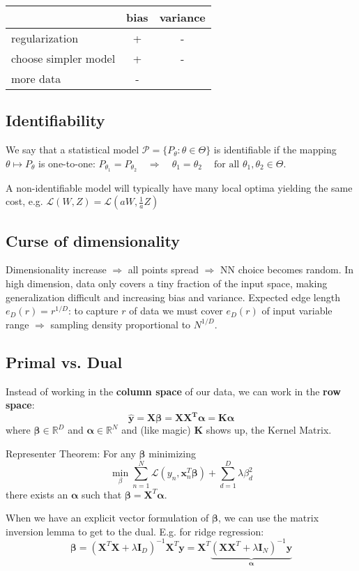 \documentclass[10pt,a4paper,landscape]{article}
\renewcommand{\bf}[1]{\ensuremath{\mathbf{#1}}}
\newcommand{\balpha}{\boldsymbol\alpha}
\newcommand{\bbeta}{\boldsymbol\beta}
\begin{document}
\begin{multicols*}{4}
\begin{tabular}{ l || c | c }
                          & bias & variance \\
  \hline
  regularization          & +    & - \\
  choose simpler model    & +    & - \\
  more data               & -    & \\
  \hline
\end{tabular}

\subsection{Identifiability}
We say that a statistical model $\mathcal{P} = \{P_\theta: \theta \in \Theta\}$ is identifiable if the mapping $\theta \mapsto P_\theta$ is one-to-one:
$P_{\theta_1}=P_{\theta_2} \quad\Rightarrow\quad \theta_1=\theta_2 \quad\ \text{for all } \theta_1,\theta_2\in\Theta.$

A non-identifiable model will typically have many local optima yielding the same cost, e.g. $\mathcal{L}(W, Z) = \mathcal{L}(aW, \frac{1}{a} Z)$

\subsection{Curse of dimensionality}
Dimensionality increase $\Rightarrow$ all points spread $\Rightarrow$ NN choice becomes random. 
In high dimension, data only covers a tiny fraction of the input space, making generalization difficult and increasing bias and variance.
Expected edge length $e_D(r) = r^{1/D}$: to capture $r$ of data we must cover $e_D(r)$ of input variable range $\Rightarrow$ sampling density proportional to $N^{1/D}$.

\subsection{Primal vs. Dual}
Instead of working in the \textbf{column space} of our data, we can work in the \textbf{row space}:
$$\bf{\hat{y} = X \bbeta = X X^T \balpha = K \balpha}$$
where $\bbeta \in \mathbb{R}^D$ and $\balpha \in \mathbb{R}^N$
and (like magic) $\bf{K}$ shows up, the Kernel Matrix.

Representer Theorem: For any $\bbeta$ minimizing
$$\min_\beta \sum_{n=1}^N \mathcal{L}(y_n, \bf{x}_n^T \bbeta) + \sum_{d=1}^D \lambda \beta_d^2$$
there exists an $\balpha$ such that $\bbeta = \bf{X}^T \balpha$.

When we have an explicit vector formulation of $\bbeta$, we can use the matrix inversion lemma to get to the dual. E.g. for ridge regression:
$$\bbeta = (\bf{X}^T \bf{X}  + \lambda \bf{I}_D)^{-1} \bf{X}^T \bf{y}= \bf{X}^T \underbrace{(\bf{X X}^T + \lambda \bf{I}_N)^{-1} \bf{y}}_{\balpha}$$


\end{multicols*}
\end{document}
